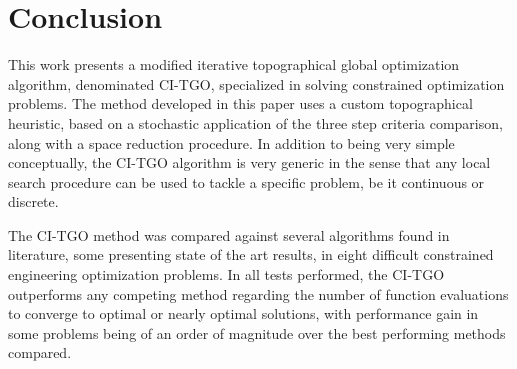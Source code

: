\section{Conclusion} \label{sec:Conclusion}

This work presents a modified iterative topographical global optimization algorithm, denominated CI-TGO, specialized in solving constrained optimization problems. The method developed in this paper uses a custom topographical heuristic, based on a stochastic application of the three step criteria comparison, along with a space reduction procedure. In addition to being very simple conceptually, the CI-TGO algorithm is very generic in the sense that any local search procedure can be used to tackle a specific problem, be it continuous or discrete.

The CI-TGO method was compared against several algorithms found in literature, some presenting state of the art results, in eight difficult constrained engineering optimization problems. In all tests performed, the CI-TGO outperforms any competing method regarding the number of function evaluations to converge to optimal or nearly optimal solutions, with performance gain in some problems being of an order of magnitude over the best performing methods compared.
